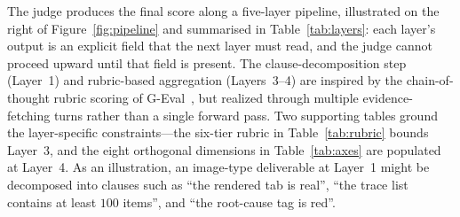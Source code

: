 The judge produces the final score along a five-layer pipeline, illustrated on the right of Figure~\ref{fig:pipeline} and summarised in Table~\ref{tab:layers}: each layer's output is an explicit field that the next layer must read, and the judge cannot proceed upward until that field is present. The clause-decomposition step (Layer~1) and rubric-based aggregation (Layers~3--4) are inspired by the chain-of-thought rubric scoring of G-Eval~\citep{liu2023geval}, but realized through multiple evidence-fetching turns rather than a single forward pass. Two supporting tables ground the layer-specific constraints---the six-tier rubric in Table~\ref{tab:rubric} bounds Layer~3, and the eight orthogonal dimensions in Table~\ref{tab:axes} are populated at Layer~4. As an illustration, an image-type deliverable at Layer~1 might be decomposed into clauses such as ``the rendered tab is real'', ``the trace list contains at least $100$ items'', and ``the root-cause tag is red''.

